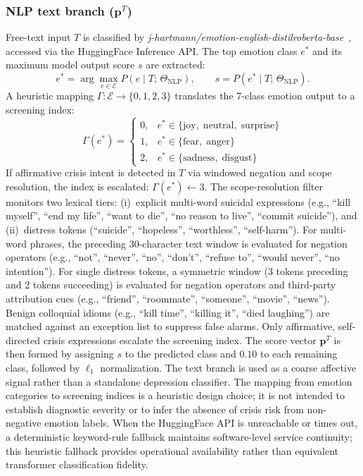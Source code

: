 \documentclass[10pt, conference, letterpaper]{IEEEtran}
\begin{document}
\subsubsection{NLP text branch ($\mathbf{p}^T$)}
Free-text input $T$ is classified by \textit{j-hartmann/emotion-english-distilroberta-base}~\cite{hartmann2022},
accessed via the HuggingFace Inference API.
The top emotion class $e^*$ and its maximum model output score $s$ are extracted:
\begin{equation}
  e^* = \arg\max_{e \in \mathcal{E}} P(e \mid T;\,\Theta_{\text{NLP}}),
  \qquad
  s = P(e^* \mid T;\,\Theta_{\text{NLP}}).
  \label{eq:nlp_argmax}
\end{equation}
A heuristic mapping $\Gamma: \mathcal{E} \to \{0,1,2,3\}$ translates the
7-class emotion output to a screening index:
\begin{equation}
  \Gamma(e^*) =
  \begin{cases}
    0, & e^* \in \{\text{joy},\;\text{neutral},\;\text{surprise}\} \\
    1, & e^* \in \{\text{fear},\;\text{anger}\} \\
    2, & e^* \in \{\text{sadness},\;\text{disgust}\}
  \end{cases}
  \label{eq:emotion_map}
\end{equation}
If affirmative crisis intent is detected in $T$ via windowed negation
and scope resolution, the index is escalated: $\Gamma(e^*) \leftarrow 3$.
The scope-resolution filter monitors two lexical tiers:
(i)~explicit multi-word suicidal expressions (e.g., ``kill myself'', ``end my life'',
``want to die'', ``no reason to live'', ``commit suicide''), and
(ii)~distress tokens (``suicide'', ``hopeless'', ``worthless'', ``self-harm'').
For multi-word phrases, the preceding 30-character text window is evaluated for
negation operators (e.g., ``not'', ``never'', ``no'', ``don't'', ``refuse to'',
``would never'', ``no intention'').
For single distress tokens, a symmetric window (3 tokens preceding and 2 tokens
succeeding) is evaluated for negation operators and third-party attribution cues
(e.g., ``friend'', ``roommate'', ``someone'', ``movie'', ``news'').
Benign colloquial idioms (e.g., ``kill time'', ``killing it'', ``died laughing'')
are matched against an exception list to suppress false alarms.
Only affirmative, self-directed crisis expressions escalate the screening index.
The score vector $\mathbf{p}^T$ is then formed by assigning $s$ to the
predicted class and $0.10$ to each remaining class, followed by
$\ell_1$ normalization.
The text branch is used as a coarse affective signal rather than a standalone
depression classifier. The mapping from emotion categories to screening indices
is a heuristic design choice; it is not intended to establish diagnostic severity
or to infer the absence of crisis risk from non-negative emotion labels.
When the HuggingFace API is unreachable or times out, a deterministic keyword-rule
fallback maintains software-level service continuity; this heuristic fallback
provides operational availability rather than equivalent transformer classification fidelity.
\end{document}
